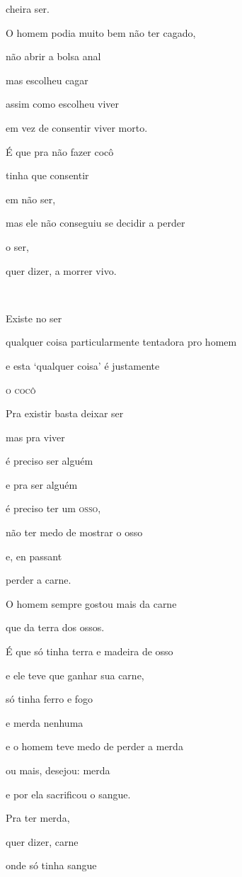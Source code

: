 cheira ser.

O homem podia muito bem não ter cagado,

não abrir a bolsa anal

mas escolheu cagar

assim como escolheu viver

em vez de consentir viver morto.

É que pra não fazer cocô

tinha que consentir

em não ser, 

mas ele não conseguiu se decidir a perder

o ser,

quer dizer, a morrer vivo.

~

Existe no ser

qualquer coisa particularmente tentadora pro homem

e esta `qualquer coisa' é justamente

\textsc{o cocô}




Pra existir basta deixar ser

mas pra viver

é preciso ser alguém

e pra ser alguém

é preciso ter um \textsc{osso}, 

não ter medo de mostrar o osso

e, en passant

perder a carne.



O homem sempre gostou mais da carne

que da terra dos ossos. 

É que só tinha terra e madeira de osso

e ele teve que ganhar sua carne,

só tinha ferro e fogo

e merda nenhuma

e o homem teve medo de perder a merda

ou mais, desejou: merda

e por ela sacrificou o sangue.

Pra ter merda, 

quer dizer, carne

onde só tinha sangue

